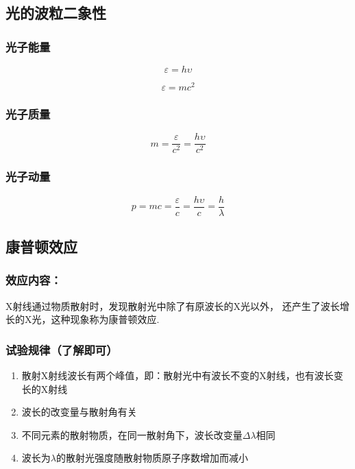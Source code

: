 \documentclass{ctexart}
\begin{document}
\subsection{光的波粒二象性}

\subsubsection{光子能量}

$$\varepsilon =h\upsilon$$

$$\varepsilon=mc^2$$

\subsubsection{光子质量}

$$m=\frac{\varepsilon}{c^2}=\frac{h\upsilon}{c^2}$$

\subsubsection{光子动量}

$$p=mc=\frac{\varepsilon}{c}=\frac{h\upsilon}{c}=\frac{h}{\lambda}$$

\subsection{康普顿效应}

\subsubsection{效应内容：}

X射线通过物质散射时，发现散射光中除了有原波长的X光以外，
还产生了波长增长的X光，这种现象称为康普顿效应.

\subsubsection{试验规律（了解即可）}
\begin{enumerate}
	\item 散射X射线波长有两个峰值，即：散射光中有波长不变的X射线，也有波长变长的X射线
	\item 波长的改变量与散射角有关
	\item 不同元素的散射物质，在同一散射角下，波长改变量$\Delta \lambda$相同
	\item 波长为$\lambda$的散射光强度随散射物质原子序数增加而减小
\end{enumerate}
\end{document}
